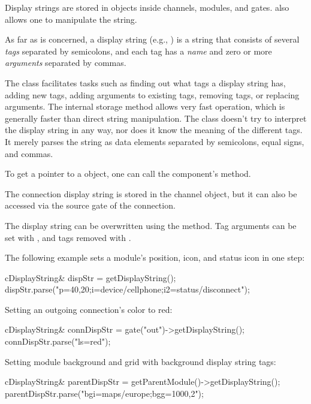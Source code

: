 Display strings are stored in  objects inside channels,
modules, and gates.  also allows one to manipulate the
string.

As far as  is concerned, a display string (e.g.,
) is a string that consists of several \textit{tags}
separated by semicolons, and each tag has a \textit{name} and zero or more
\textit{arguments} separated by commas.

The class facilitates tasks such as finding out what tags a display string has,
adding new tags, adding arguments to existing tags, removing tags, or replacing
arguments. The internal storage method allows very fast operation, which is
generally faster than direct string manipulation. The class doesn't try to
interpret the display string in any way, nor does it know the meaning of the
different tags. It merely parses the string as data elements separated by
semicolons, equal signs, and commas.

To get a pointer to a  object, one can call
the component's  method.

\begin{note}
The connection display string is stored in the channel object, but it
can also be accessed via the source gate of the connection.
\end{note}

The display string can be overwritten using the  method.
Tag arguments can be set with , and tags removed
with .

The following example sets a module's position, icon, and status icon
in one step:

\begin{cpp}
cDisplayString& dispStr = getDisplayString();
dispStr.parse("p=40,20;i=device/cellphone;i2=status/disconnect");
\end{cpp}

Setting an outgoing connection's color to red:

\begin{cpp}
cDisplayString& connDispStr = gate("out")->getDisplayString();
connDispStr.parse("ls=red");
\end{cpp}

Setting module background and grid with background display string tags:

\begin{cpp}
cDisplayString& parentDispStr = getParentModule()->getDisplayString();
parentDispStr.parse("bgi=maps/europe;bgg=1000,2");
\end{cpp}

